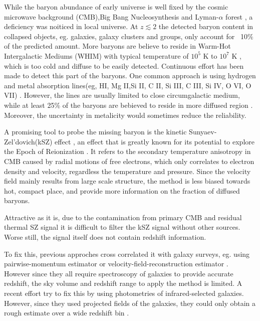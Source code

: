 While the baryon abundance of early universe is well fixed by the cosmic microwave background (CMB),Big Bang Nucleosynthesis and Lyman-$\alpha$ forest \cite{Cooke14}\cite{Fukugita98}\cite{Komatsu11}\cite{Hinshaw13}, 
a deficiency was noiticed in local universe.
At $z\lesssim 2$ the detected baryon content in collapsed
objects, eg. galaxies, galaxy clusters and groups, only account for ~10$\%$ of the predicted amount.
More baryons are believe to reside in Warm-Hot Intergalactic Mediums (WHIM) with typical temperature of $10^5$ K to $10^7$ K \cite{Pen1999}\cite{Soltan06}, which is too cold and diffuse to be easily detected.
Continuous effort has been made to detect this part of the baryons. 
One common approach is using hydrogen and metal absorption lines(eg, HI, Mg II,Si II, C II, Si III, C III, Si IV, O VI, O VII) \cite{Fukugita04}\cite{Werk14}.
However, the lines are usually limited to close circumgalactic medium, while at least 25\% of the baryons are bebieved to reside in more diffused region \cite{Dave10}. Moreover, the uncertainty in metalicity would sometimes reduce the reliability.

A promising tool to probe the missing baryon is the kinetic Sunyaev-Zel'dovich(kSZ) effect \cite{Sunyaev72}\cite{Sunyaev80}, 
  an effect that is greatly known for its potential to explore the Epoch of Reionization \cite{Zhang04}\cite{McQuinn05}\cite{Zahn12}. 
It refers to the secondary temperature anisotropy in CMB caused by radial motions of free electrons, 
  which only correlates to electron density and velocity, 
regardless the temperature and pressure. 
Since the velocity field mainly results from large scale structure, 
the method is less biased towards hot, compact place, 
and provide more information on the fraction of diffused baryons.

Attractive as it is, 
due to the contamination from primary CMB and residual thermal SZ signal
it is difficult to filter the kSZ signal without other sources. 
Worse still, the signal itself does not contain redshift information.

To fix this, previous approches cross correlated it with galaxy surveys, 
eg. using pairwise-momentum estimator \cite{Hand12} or velocity-field-reconstruction estimator \cite{Shao11}\cite{Li14}. 
However since they all require spectroscopy of galaxies to provide accurate redshift, the sky volume and redshift range to apply the method is limited. 
A recent effort try to fix this by using photometries of infrared-selected galaxies. 
However, since they used projected fields of the galaxies, they could only obtain a rough estimate over a wide redshift bin \cite{Hill16}.

